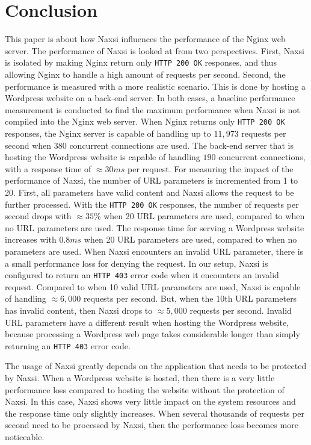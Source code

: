 \documentclass[Conclusion]{subfiles}
\begin{document}
\section{Conclusion}
\label{sec:Conclusion}
This paper is about how Naxsi influences the performance of the \mbox{Nginx} web server. The performance of Naxsi is looked at from two perspectives. First, Naxsi is isolated by making Nginx return only \verb+HTTP 200 OK+ responses, and thus allowing Nginx to handle a high amount of requests per second. Second, the performance is measured with a more realistic scenario. This is done by hosting a Wordpress website on a back-end server. In both cases, a baseline performance measurement is conducted to find the maximum performance when Naxsi is not compiled into the Nginx web server. When Nginx returns only \verb+HTTP 200 OK+ responses, the Nginx server is capable of handling up to $11,973$ requests per second when $380$ concurrent connections are used. The back-end server that is hosting the Wordpress website is capable of handling $190$ concurrent connections, with a response time of $\approx 30 ms$ per request. For measuring the impact of the performance of Naxsi, the number of URL parameters is incremented from 1 to 20. First, all parameters have valid content and Naxsi allows the request to be further processed. With the \verb+HTTP 200 OK+ responses, the number of requests per second drops with $\approx 35\%$ when 20 URL parameters are used, compared to when no URL parameters are used. The response time for serving a Wordpress website increases with $0.8 ms$ when 20 URL parameters are used, compared to when no parameters are used. When Naxsi encounters an invalid URL parameter, there is a small performance loss for denying the request. In our setup, Naxsi is configured to return an \verb+HTTP 403+ error code when it encounters an invalid request. Compared to when 10 valid URL parameters are used, Naxsi is capable of handling $\approx 6,000$ requests per second. But, when the 10th URL parameters has invalid content, then Naxsi drops to $\approx 5,000$ requests per second. Invalid URL parameters have a different result when hosting the Wordpress website, because processing a Wordpress web page takes considerable longer than simply returning an \verb+HTTP 403+ error code.

The usage of Naxsi greatly depends on the application that needs to be protected by Naxsi. When a Wordpress website is hosted, then there is a very little performance loss compared to hosting the website without the protection of Naxsi. In this case, Naxsi shows very little impact on the system resources and the response time only slightly increases. When several thousands of requests per second need to be processed by Naxsi, then the performance loss becomes more noticeable. 
\end{document}
